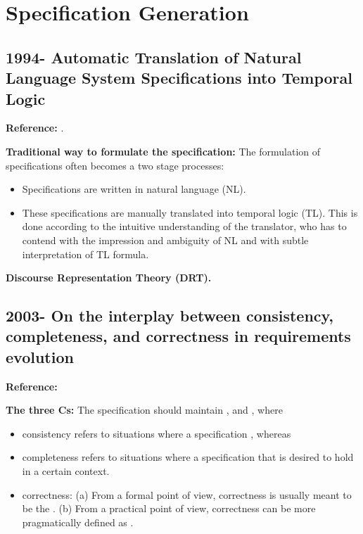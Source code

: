 \section{Specification Generation}

\crule

\subsection{1994- Automatic Translation of Natural Language System 
  Specifications into Temporal Logic}

\textbf{Reference:} \cite{nelken1996automatic}.

\textbf{Traditional way to formulate the specification:}
The formulation of specifications often becomes a two stage processes:
\begin{itemize}
  \item Specifications are written in natural language (NL).
  \item These specifications are manually translated into temporal logic (TL).
    This is done according to the intuitive understanding of the translator,
    who has to contend with the impression and ambiguity of NL and with subtle 
    interpretation of TL formula.
\end{itemize}

\textbf{Discourse Representation Theory (DRT).}

\crule

\subsection{2003- On the interplay between consistency, 
  completeness, and correctness in requirements evolution}

\textbf{Reference:} \cite{zowghi2003interplay}

\textbf{The three Cs:}
The specification should maintain ,  
and , where
\begin{itemize}
  \item consistency refers to situations where a specification 
    , whereas
  \item completeness refers to situations where a specification 
     that is desired 
    to hold in a certain context.
  \item correctness:
    (a) From a formal point of view, correctness is usually meant to be 
      the .
    (b) From a practical point of view, correctness can be more 
      pragmatically defined as .
\end{itemize}

